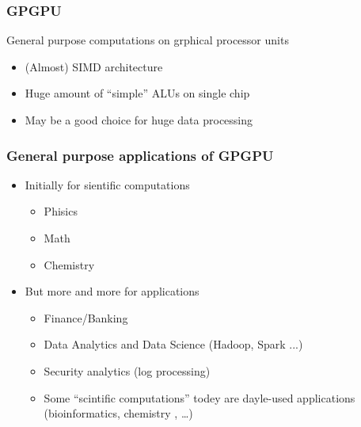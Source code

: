 \documentclass[xcolor=table]{beamer}
\begin{document}
\begin{frame}[fragile]
  \transwipe[direction=90]
  \frametitle{GPGPU}
  \begin{minipage}[m]{0.40\linewidth}
\end{minipage}\hfill
\begin{minipage}[m]{0.6\linewidth}
General purpose computations on grphical processor units
\begin{itemize}
      \item (Almost) SIMD architecture 
      \item Huge amount of ``simple'' ALUs on single chip
      \item May be a good choice for huge data processing
\end{itemize}

\end{minipage}

\end{frame}

\begin{frame}[fragile]
  \transwipe[direction=90]
  \frametitle{General purpose applications of GPGPU}
  \begin{itemize}
    \item Initially for sientific computations
    \begin{itemize}
      \item Phisics
      \item Math
      \item Chemistry
    \end{itemize}
    \item But more and more for applications
      \begin{itemize} 
        \item Finance/Banking
        \item Data Analytics and Data Science (Hadoop, Spark ...)
        \item Security analytics (log processing)
        \item Some ``scintific computations'' todey are dayle-used applications (bioinformatics, chemistry , \dots)
      \end{itemize}
  \end{itemize}
\end{frame}
\end{document}
